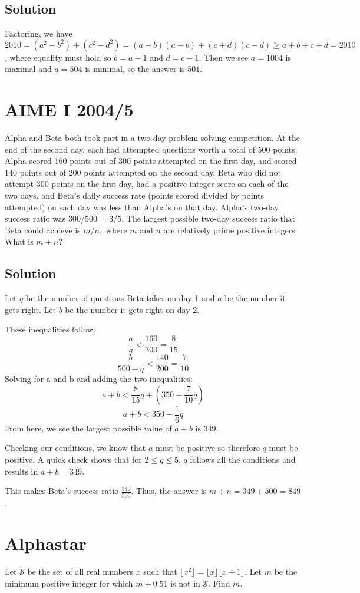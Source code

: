 \documentclass{article}
\begin{document}
\subsection{Solution}
Factoring, we have
$2010 = (a^2 - b^2) + (c^2 - d^2) = (a + b)(a - b) + (c + d)(c - d) \ge a + b + c + d = 2010$, where equality must hold so $b = a - 1$ and $d = c - 1$. Then we see $a = 1004$ is maximal and $a = 504$ is minimal, so the answer is $\boxed{501}$.
\pagebreak\section{AIME I 2004/5}
Alpha and Beta both took part in a two-day problem-solving competition. At the end of the second day, each had attempted questions worth a total of 500 points. Alpha scored 160 points out of 300 points attempted on the first day, and scored 140 points out of 200 points attempted on the second day. Beta who did not attempt 300 points on the first day, had a positive integer score on each of the two days, and Beta's daily success rate (points scored divided by points attempted) on each day was less than Alpha's on that day. Alpha's two-day success ratio was 300/500 = 3/5. The largest possible two-day success ratio that Beta could achieve is $m/n,$ where $m$ and $n$ are relatively prime positive integers. What is $m+n$?
\subsection{Solution}
Let $q$ be the number of questions Beta takes on day 1 and $a$ be the number it gets right. Let $b$ be the number it gets right on day 2.

These inequalities follow:\[\frac{a}{q} < \frac{160}{300} = \frac{8}{15}\]\[\frac{b}{500-q} < \frac{140}{200} = \frac{7}{10}\]Solving for a and b and adding the two inequalities:\[a + b < \frac{8}{15}q + (350 - \frac{7}{10}q)\]\[a + b < 350 - \frac{1}{6}q\]From here, we see the largest possible value of $a+b$ is $349$.

Checking our conditions, we know that $a$ must be positive so therefore $q$ must be positive. A quick check shows that for $2\le q \le 5$, $q$ follows all the conditions and results in $a+b=349$.

This makes Beta's success ratio $\frac{349}{500}$. Thus, the answer is $m+n = 349 + 500 = \boxed{849}$.

\pagebreak\section{Alphastar}
Let $\mathcal{S}$ be the set of all real numbers $x$ such that $\lfloor x^2\rfloor=\lfloor x\rfloor\lfloor x+1\rfloor$. Let $m$ be the minimum positive integer for which $m+0.51$ is not in $\mathcal{S}$. Find $m$.
\end{document}
